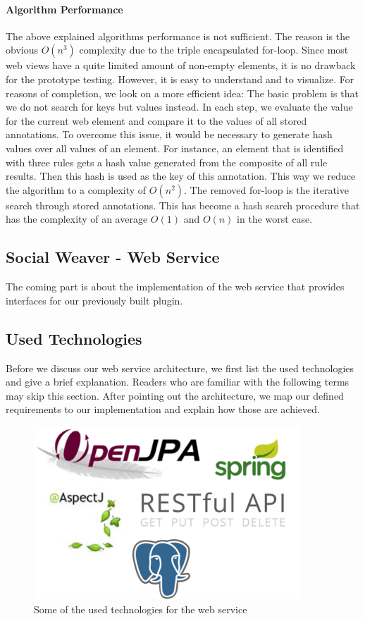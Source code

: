 \paragraph{Algorithm Performance}
The above explained algorithms performance is not sufficient. The reason is the obvious $O(n^3)$ complexity due to the triple encapsulated for-loop. Since most web views have a quite limited amount of non-empty elements, it is no drawback for the prototype testing. However, it is easy to understand and to visualize. 
For reasons of completion, we look on a more efficient idea:
The basic problem is that we do not search for keys but values instead. In each step, we evaluate the value for the current web element and compare it to the values of all stored annotations. To overcome this issue, it would be necessary to generate hash values over all values of an element. 
For instance, an element that is identified with three rules gets a hash value generated from the composite of all rule results. Then this hash is used as the key of this annotation. 
This way we reduce the algorithm to a complexity of $O(n^2)$. The removed for-loop is the iterative search through stored annotations. This has become a hash search procedure that has the complexity of an average $O(1)$ and $O(n)$ in the worst case.

\newpage
\subsection{Social Weaver - Web Service}
The coming part is about the implementation of the web service that provides interfaces for our previously built plugin.

\subsection{Used Technologies}
Before we discuss our web service architecture, we first list the used technologies and give a brief explanation. Readers who are familiar with the following terms may skip this section. 
After pointing out the architecture, we map our defined requirements to our implementation and explain how those are achieved.

\begin{figure}\centering
		\includegraphics[width=10cm]{images/ws-technologies-logos.png}
		\caption{Some of the used technologies for the web service}
		\label{ws-technologies-logos}
\end{figure} 

